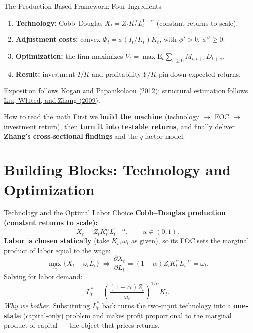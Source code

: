 \documentclass{beamer}
\begin{document}
\begin{frame}{The Production-Based Framework: Four Ingredients}
	\begin{enumerate}
		\item \textbf{Technology:} Cobb--Douglas $X_t=Z_tK_t^\alpha L_t^{1-\alpha}$ (constant returns to scale).
		\item \textbf{Adjustment costs:} convex $\Phi_t=\phi(I_t/K_t)K_t$, with $\phi'>0,\ \phi''\ge 0$.
		\item \textbf{Optimization:} the firm maximizes $V_t=\max \mathrm{E}_t\sum_{s\ge0}M_{t,t+s}D_{t+s}$.
		\item \textbf{Result:} investment $I/K$ and profitability $Y/K$ pin down expected returns.
	\end{enumerate}
	\vspace{4pt}
	Exposition follows \textcolor{blue}{\href{https://doi.org/10.1146/annurev-financial-110311-101731}{Kogan and Papanikolaou (2012)}}; structural estimation follows \textcolor{blue}{\href{https://doi.org/10.1086/649760}{Liu, Whited, and Zhang (2009)}}.
	\begin{block}{How to read the math}
		First we \textbf{build the machine} (technology $\to$ FOC $\to$ investment return), then \textbf{turn it into testable returns}, and finally deliver \textbf{Zhang's cross-sectional findings} and the $q$-factor model.
	\end{block}
\end{frame}

\section{Building Blocks: Technology and Optimization}

\begin{frame}{Technology and the Optimal Labor Choice}
	\textbf{Cobb--Douglas production (constant returns to scale):}
	\begin{equation}\label{equ:production}
		X_t = Z_t K_t^\alpha L_t^{1-\alpha},\qquad \alpha\in(0,1).
	\end{equation}
	\textbf{Labor is chosen statically} (take $K_t,\omega_t$ as given), so its FOC sets the marginal product of labor equal to the wage:
	\begin{equation*}
		\max_{L_t}\{X_t-\omega_t L_t\}\ \Rightarrow\ \frac{\partial X_t}{\partial L_t}=(1-\alpha)Z_tK_t^\alpha L_t^{-\alpha}=\omega_t.
	\end{equation*}
	Solving for labor demand:
	\begin{equation}\label{equ:optimal labor supply}
		L_t^*=\left(\frac{(1-\alpha)Z_t}{\omega_t}\right)^{1/\alpha}K_t.
	\end{equation}
	\vspace{2pt}
	\textit{Why we bother.} Substituting $L_t^*$ back turns the two-input technology into a \textbf{one-state} (capital-only) problem and makes profit proportional to the marginal product of capital --- the object that prices returns.
\end{frame}
\end{document}
